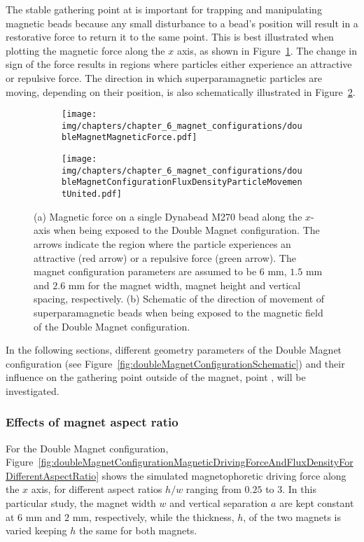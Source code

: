 The stable gathering point at  is important for trapping and manipulating magnetic beads because any small disturbance to a bead's position will result in a restorative force to return it to the same point. This is best illustrated when plotting the magnetic force along the $x$ axis, as shown in Figure~\ref{fig:doubleMagnetConfiguraitonMagneticDrivingForce}. The change in sign of the force results in regions where particles either experience an attractive or repulsive force. The direction in which superparamagnetic particles are moving, depending on their position, is also schematically illustrated in Figure~\ref{fig:doubleMagnetConfigurationBeadMovementSchematic}.
\begin{figure}[htb]
   \centering
   \begin{subfigure}[b]{0.48\textwidth}
   \texttt{[image: img/chapters/chapter\_6\_magnet\_configurations/doubleMagnetMagneticForce.pdf]}
   \caption{}
   \label{fig:doubleMagnetConfiguraitonMagneticDrivingForce}
   \end{subfigure}
   \hfill
   \begin{subfigure}[b]{0.48\textwidth}
   \texttt{[image: img/chapters/chapter\_6\_magnet\_configurations/doubleMagnetConfigurationFluxDensityParticleMovementUnited.pdf]}
   \caption{}
   \label{fig:doubleMagnetConfigurationBeadMovementSchematic}
   \end{subfigure}
   \caption[Magnetic driving force of the Double Magnet configuration on a superparamagnetic bead]{(a) Magnetic force on a single Dynabead M270  bead along the $x$-axis when being exposed to the Double Magnet configuration. The arrows indicate the region where the particle experiences an attractive (red arrow) or a repulsive force (green arrow). The magnet configuration parameters are assumed to be $6$ mm, $1.5$ mm and $2.6$ mm for the magnet width, magnet height and vertical spacing, respectively. (b) Schematic of the direction of movement of superparamagnetic beads when being exposed to the magnetic field of the Double Magnet configuration.}
   \label{fig:doubleMagnetConfigurationMagneticDrivingForceAndBeadMovementSchematic}
\end{figure}
In the following sections, different geometry parameters of the Double Magnet configuration (see Figure~\ref{fig:doubleMagnetConfigurationSchematic}) and their influence on the gathering point outside of the magnet, point , will be investigated.

\subsubsection{Effects of magnet aspect ratio}\label{subsubsec:effectsOfMagnetAspectRatio}
For the Double Magnet configuration, Figure~\ref{fig:doubleMagnetConfigurationMagneticDrivingForceAndFluxDensityForDifferentAspectRatio} shows the  simulated magnetophoretic driving force along the $x$ axis, for different aspect ratios $h/w$ ranging from $0.25$ to $3$. In this particular study, the magnet width $w$ and vertical separation $a$ are kept constant at $6$ mm and $2$ mm, respectively, while the thickness, $h$, of the two magnets is varied keeping $h$ the same for both magnets. 

